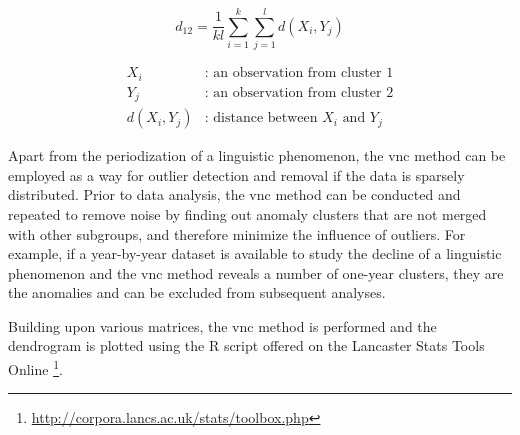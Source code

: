 \begin{equation}
  d_{12} = \frac{1}{kl}\displaystyle\sum\limits_{i=1}^k {\displaystyle\sum\limits_{j=1}^l d(X_i, Y_j)}
  \label{equ:avg_linkage_func}
\end{equation}

\begin{equation*}
  \begin{aligned}
    X_i &\text{: an observation from cluster 1} \\
    Y_j &\text{: an observation from cluster 2} \\
    d(X_i, Y_j) &\text{: distance between } X_i \text{ and } Y_j
  \end{aligned}
\end{equation*}

Apart from the periodization of a linguistic phenomenon, the \gls{vnc} method can be employed as a way for outlier detection and removal if the data is sparsely distributed. Prior to data analysis, the \gls{vnc} method can be conducted and repeated to remove noise by finding out anomaly clusters that are not merged with other subgroups, and therefore minimize the influence of outliers. For example, if a year-by-year dataset is available to study the decline of a linguistic phenomenon and the \gls{vnc} method reveals a number of one-year clusters, they are the anomalies and can be excluded from subsequent analyses.

Building upon various matrices, the \gls{vnc} method is performed and the dendrogram is plotted using the R script offered on the Lancaster Stats Tools Online \parencite{brezina2018statistics}\footnote{\url{http://corpora.lancs.ac.uk/stats/toolbox.php}}.

